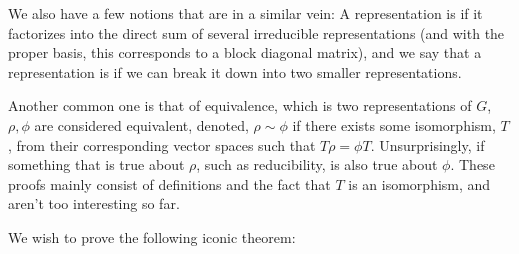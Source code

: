 \documentclass{article}
\begin{document}
We also have a few notions that are in a similar vein: A representation is  if it factorizes into the direct sum of several irreducible representations (and with the proper basis, this corresponds to a block diagonal matrix), and we say that a representation is  if we can break it down into two smaller representations.

Another common one is that of equivalence, which is two representations of $G$, $\rho, \phi$  are considered equivalent, denoted, $\rho \sim \phi$ if there exists some isomorphism, $T$, from their corresponding vector spaces such that $T\rho=\phi T$. Unsurprisingly, if something that is true about $\rho$, such as reducibility, is also true about $\phi$. These proofs mainly consist of definitions and the fact that $T$ is an isomorphism, and aren't too interesting so far.

We wish to prove the following iconic theorem:
\end{document}
